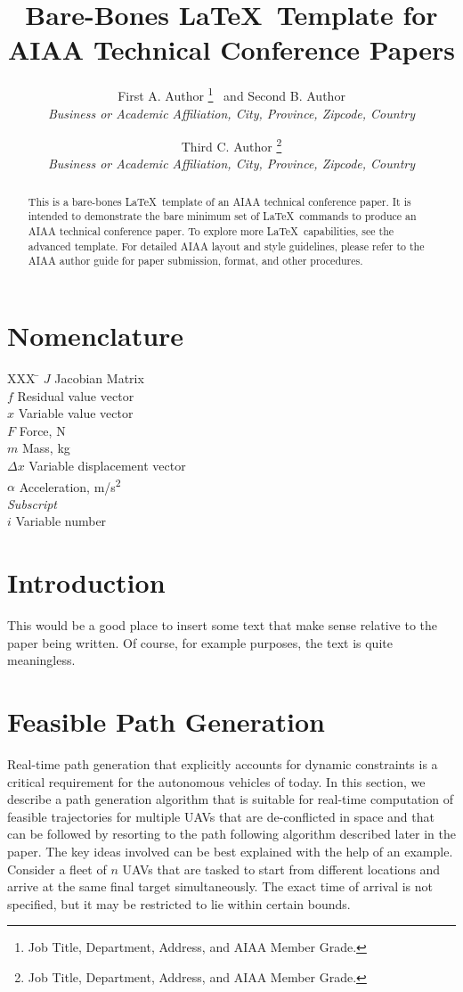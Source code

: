 \documentclass[]{aiaa-tc}%
\title{Bare-Bones \LaTeX\ Template for\\
        AIAA Technical Conference Papers}
\author{
  First A. Author%
    \thanks{Job Title, Department, Address, and AIAA Member Grade.}
  \ and Second B. Author\thanksibid{1}\\
  {\normalsize\itshape
   Business or Academic Affiliation, City, Province, Zipcode, Country}\\
  \and
  Third C. Author%
   \thanks{Job Title, Department, Address, and AIAA Member Grade.}\\
  {\normalsize\itshape
  Business or Academic Affiliation, City, Province, Zipcode, Country}
 }
\begin{document}
\maketitle

\begin{abstract}
This is a bare-bones \LaTeX\ template of an AIAA technical conference paper.
It is intended to demonstrate the bare minimum set of \LaTeX\ commands
to produce an AIAA technical conference paper.
To explore more \LaTeX\ capabilities, see the advanced template.
For detailed AIAA layout and style guidelines, please refer to the AIAA
author guide for paper submission, format, and other procedures.
\end{abstract}

\section*{Nomenclature}

\begin{tabbing}
  XXX \= \kill%
  $J$ \> Jacobian Matrix \\
  $f$ \> Residual value vector \\
  $x$ \> Variable value vector \\
  $F$ \> Force, N \\
  $m$ \> Mass, kg \\
  $\Delta x$ \> Variable displacement vector \\
  $\alpha$ \> Acceleration, m/s\textsuperscript{2} \\[5pt]
  \textit{Subscript}\\
  $i$ \> Variable number \\
 \end{tabbing}

\section{Introduction}

This would be a good place to insert some text that make sense relative
to the paper being written.
Of course, for example purposes, the text is quite meaningless.


\section{Feasible Path Generation}


Real-time path generation that explicitly accounts for dynamic
constraints is a critical requirement for the autonomous vehicles
of today. In this section, we describe a path generation algorithm
that is suitable for real-time computation of feasible
trajectories for multiple UAVs that are de-conflicted in space and
that can be followed by resorting to the path following algorithm
described later in the paper. The key ideas involved can be best
explained with the help of an example. Consider a fleet of $n$
UAVs that are tasked to start from different locations and arrive
at the same final target simultaneously. The exact time of arrival
is not specified, but it may be restricted to lie within certain
bounds.
\end{document}
